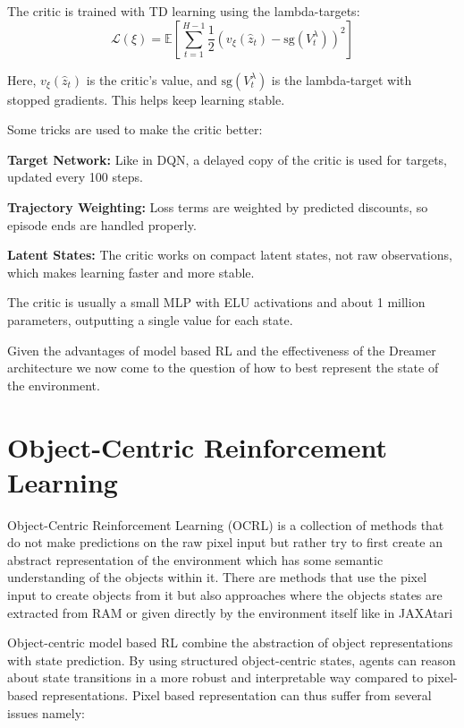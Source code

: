 \documentclass[
	english,
	ruledheaders=section,
	class=report,
	thesis={type=master},
	accentcolor=9c,
	custommargins=true,
	marginpar=false,
	parskip=half-,
	fontsize=11pt,
]{tudapub}
\begin{document}
The critic is trained with TD learning using the lambda-targets:
\begin{equation}
	\mathcal{L}(\xi) = \mathbb{E}\left[\sum_{t=1}^{H-1} \frac{1}{2} \left(v_\xi(\hat{z}_t) - \text{sg}(V^{\lambda}_t)\right)^2\right]
\end{equation}

Here, $v_\xi(\hat{z}_t)$ is the critic's value, and $\text{sg}(V^{\lambda}_t)$
is the lambda-target with stopped gradients. This helps keep learning stable.

Some tricks are used to make the critic better:

\textbf{Target Network:} Like in DQN, a delayed copy of the critic is used for targets, updated every 100 steps.

\textbf{Trajectory Weighting:} Loss terms are weighted by predicted discounts, so episode ends are handled properly.

\textbf{Latent States:} The critic works on compact latent states, not raw observations, which makes learning faster and more stable.

The critic is usually a small MLP with ELU activations and about 1 million
parameters, outputting a single value for each state.

Given the advantages of model based RL and the effectiveness of the Dreamer
architecture we now come to the question of how to best represent the state of
the environment.

\section{Object-Centric Reinforcement Learning}
\label{sec:object_centric_rl}

Object-Centric Reinforcement Learning (OCRL) is a collection of methods that do
not make predictions on the raw pixel input but rather try to first create an
abstract representation of the environment which has some semantic
understanding of the objects within it. There are methods that use the pixel
input to create objects from it \cite{greff2020object} but also approaches
where the objects states are extracted from RAM \cite{delfosse2023ocatari} or
given directly by the environment itself like in JAXAtari

Object-centric model based RL combine the abstraction of object representations
with state prediction. By using structured object-centric states, agents can
reason about state transitions in a more robust and interpretable way compared
to pixel-based representations. Pixel based representation can thus suffer from
several issues namely:
\end{document}
